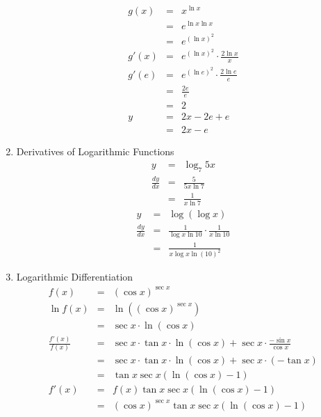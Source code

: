 \documentclass{article}
\begin{document}
\begin{enumerate}
    \begin{eqnarray}
        g(x) &=& x^{\ln{x}} \\
             &=& e^{\ln{x}\ln{x}} \\
             &=& e^{\left(\ln{x}\right)^2} \\
        g'(x) &=& e^{\left(\ln{x}\right)^2} \cdot \frac{2\ln{x}}{x} \\
        g'(e) &=& e^{\left(\ln{e}\right)^2} \cdot \frac{2\ln{e}}{e} \\
              &=& \frac{2e}{e} \\
              &=& 2 \\
        y &=& 2x - 2e + e \\
          &=& 2x - e
    \end{eqnarray}
    \item Derivatives of Logarithmic Functions
    \begin{eqnarray}
        y &=& \log_7{5x} \\
        \frac{dy}{dx} &=& \frac{5}{5x\ln{7}} \\
                      &=& \frac{1}{x\ln{7}}
    \end{eqnarray}
    \begin{eqnarray}
        y &=& \log{\left(\log{x}\right)} \\
        \frac{dy}{dx} &=& \frac{1}{\log{x}\ln{10}} \cdot \frac{1}{x\ln{10}} \\
                      &=& \frac{1}{x\log{x}\ln{\left(10\right)}^2}
    \end{eqnarray}
    \item Logarithmic Differentiation
    \begin{eqnarray}
        f(x) &=& \left(\cos{x}\right)^{\sec{x}} \\
        \ln{f(x)} &=& \ln{\left(\left(\cos{x}\right)^{\sec{x}}\right)} \\
                  &=& \sec{x} \cdot \ln{\left(\cos{x}\right)} \\
        \frac{f'(x)}{f(x)} &=& \sec{x} \cdot \tan{x} \cdot \ln{\left(\cos{x}\right)} + \sec{x} \cdot \frac{-\sin{x}}{\cos{x}} \\
                      &=& \sec{x} \cdot \tan{x} \cdot \ln{\left(\cos{x}\right)} + \sec{x} \cdot \left(-\tan{x}\right) \\
                      &=& \tan{x}\sec{x}\left(\ln{\left(\cos{x}\right)} - 1\right) \\
        f'(x) &=& f(x)\tan{x}\sec{x}\left(\ln{\left(\cos{x}\right)} - 1\right) \\
              &=& \left(\cos{x}\right)^{\sec{x}}\tan{x}\sec{x}\left(\ln{\left(\cos{x}\right)} - 1\right) \\
    \end{eqnarray}
\end{enumerate}
\end{document}
